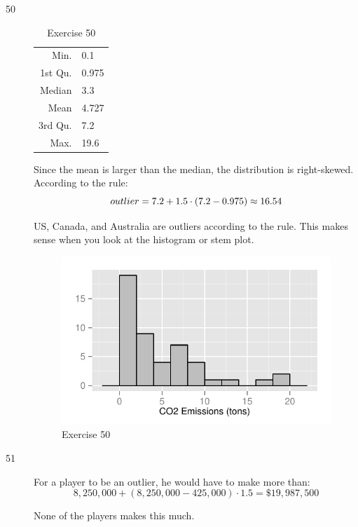 \documentclass[letterpaper, landscape]{exam}
\begin{document}
\begin{description}


      \item[50]
        \begin{table}[H]
          \centering
          \begin{tabular}{rl}
            \toprule
            Min.    & 0.1 \\
            1st Qu. & 0.975 \\
            Median  & 3.3 \\
            Mean    & 4.727 \\
            3rd Qu. & 7.2 \\
            Max.    & 19.6 \\
            \bottomrule
          \end{tabular}
          \caption{Exercise 50}
        \end{table}

        Since the mean is larger than the median, the distribution is right-skewed.
        According to the rule:
        \[
          outlier = 7.2 + 1.5 \cdot (7.2 - 0.975) \approx 16.54 \\
        \]

        US, Canada, and Australia are outliers according to the rule.  This
        makes sense when you look at the histogram or stem plot.

        \begin{figure}[H]
          \centering
          \includegraphics{figures/ex50.pdf}
          \caption{Exercise 50}
        \end{figure}

      \item[51] 
        For a player to be an outlier, he would have to make more than:
        \[
          8,250,000 + (8,250,000 - 425,000) \cdot 1.5 = \$19,987,500
        \]

        None of the players makes this much.

    \end{description}
\end{document}
